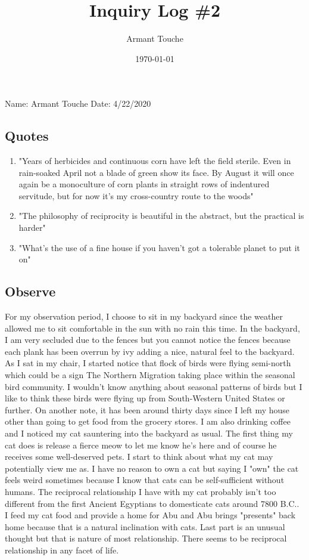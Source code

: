 \documentclass[a4paper,man,biblatex]{apa6}
\title{Inquiry Log \#2}
\author{Armant Touche}
\affiliation{Portland State University}
\date{\today}
\begin{document}
\thispagestyle{otherpage}
\setcounter{biburllcpenalty}{7000}
\setcounter{biburlucpenalty}{8000}


\noindent Name: Armant Touche\newline
\noindent Date: 4/22/2020

\subsection{Quotes}
\begin{enumerate}
    \item "Years of herbicides and continuous corn have left the field sterile. Even in rain-soaked April not a blade of green show its face. By August it will once again be a monoculture of corn plants in straight rows of indentured servitude, but for now it's my cross-country route to the woods"\autocite[175]{braiding}
    \item "The philosophy of reciprocity is beautiful in the abstract, but the practical is harder" \autocite[238]{braiding}
    \item "What's the use of a fine house if you haven't got a tolerable planet to put it on" \autocite{capecod}
\end{enumerate}

\subsection{Observe} For my observation period, I choose to sit in my backyard since the weather allowed me to sit comfortable in the sun with no rain this time. In the backyard, I am very secluded due to the fences but you cannot notice the fences because each plank has been overrun by ivy adding a nice, natural feel to the backyard. As I sat in my chair, I started notice that flock of birds were flying semi-north which could be a sign The Northern Migration taking place within the seasonal bird community. I wouldn't know anything about seasonal patterns of birds but I like to think these birds were flying up from South-Western United States or further. On another note, it has been around thirty days since I left my house other than going to get food from the grocery stores. I am also drinking coffee and I noticed my cat sauntering into the backyard as usual. The first thing my cat does is release a fierce meow to let me know he's here and of course he receives some well-deserved pets. I start to think about what my cat may potentially view me as. I have no reason to own a cat but saying I "own" the cat feels weird sometimes because I know that cats can be self-sufficient without humans. The reciprocal relationship I have with my cat probably isn't too different from the first Ancient Egyptians to domesticate cats around 7800 B.C.. I feed my cat food and provide a home for Abu and Abu brings "presents" back home because that is a natural inclination with cats. Last part is an unusual thought but that is nature of most relationship. There seems to be reciprocal relationship in any facet of life.
\end{document}
